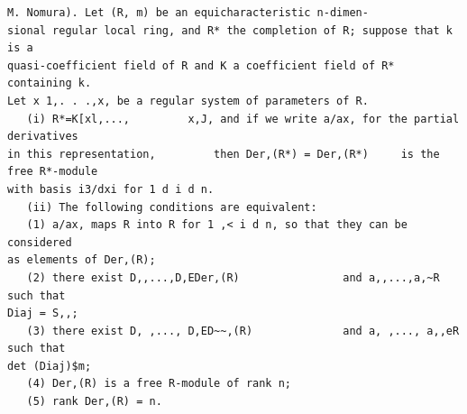\begin{theorem}\label{mcrt-auto-theorem-30-6}\uses{}
\begin{verbatim}
M. Nomura). Let (R, m) be an equicharacteristic n-dimen-
sional regular local ring, and R* the completion of R; suppose that k is a
quasi-coefficient field of R and K a coefficient field of R* containing k.
Let x 1,. . .,x, be a regular system of parameters of R.
   (i) R*=K[xl,...,         x,J, and if we write a/ax, for the partial derivatives
in this representation,         then Der,(R*) = Der,(R*)     is the free R*-module
with basis i3/dxi for 1 d i d n.
   (ii) The following conditions are equivalent:
   (1) a/ax, maps R into R for 1 ,< i d n, so that they can be considered
as elements of Der,(R);
   (2) there exist D,,...,D,EDer,(R)                and a,,...,a,~R      such that
Diaj = S,,;
   (3) there exist D, ,..., D,ED~~,(R)              and a, ,..., a,,eR such that
det (Diaj)$m;
   (4) Der,(R) is a free R-module of rank n;
   (5) rank Der,(R) = n.
\end{verbatim}
\end{theorem}
